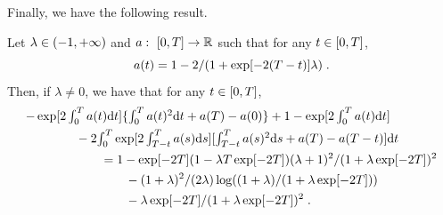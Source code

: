   Finally, we have the following result.

  \begin{proposition}
    \label{prop:explicit_lambda}
        Let $\lambda \in \left(-1, +\infty\right)$ and $a: \ \left[0,T\right] \to \mathbb{R}$ such
  that for any $t \in \left[0,T\right]$,
  \begin{equation}
    a(t) = 1 - 2/(1 + \exp[-2(T-t)]\lambda) \; . 
  \end{equation}
  Then, if $\lambda \neq 0$, we have that for any $t \in \left[0,T\right]$,
  \begin{align}
    &\textstyle{-\exp[2\int_0^T a(t) \mathrm{d}t]\{ \int_0^Ta(t)^2 \mathrm{d}t + a(T) - a(0)\} + 1 - \exp[2\int_0^T a(t) \mathrm{d}t]} \\
    & \qquad \qquad - 2 \textstyle{\int_0^T \exp[2\int_{T-t}^T a(s) \mathrm{d}s] [\int_{T-t}^T a(s)^2 \mathrm{d}s + a(T) - a(T-t)] \mathrm{d}t } \\
    & \qquad \qquad \qquad = 1 - \exp[-2T] (1 - \lambda T \exp[-2T]) (\lambda+1)^2/(1 +\lambda \exp[-2T])^2 \\
   & \qquad \qquad \qquad \qquad - (1+\lambda)^2/(2\lambda)\log((1+\lambda)/(1 + \lambda \exp[-2T])) \\
  & \qquad \qquad \qquad \qquad -\lambda\exp[-2T]/(1 + \lambda \exp[-2T])^2 \; . 
      \end{align}

\end{proposition}
